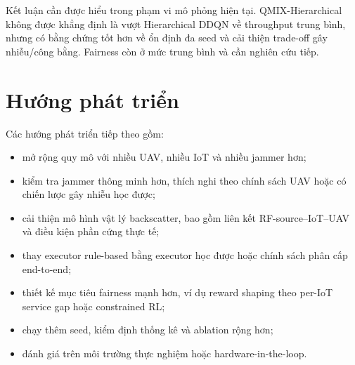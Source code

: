 Kết luận cần được hiểu trong phạm vi mô phỏng hiện tại. QMIX-Hierarchical không được khẳng định là vượt Hierarchical DDQN về throughput trung bình, nhưng có bằng chứng tốt hơn về ổn định đa seed và cải thiện trade-off gây nhiễu/công bằng. Fairness còn ở mức trung bình và cần nghiên cứu tiếp.

\section{Hướng phát triển}

Các hướng phát triển tiếp theo gồm:

\begin{itemize}
  \item mở rộng quy mô với nhiều UAV, nhiều IoT và nhiều jammer hơn;
  \item kiểm tra jammer thông minh hơn, thích nghi theo chính sách UAV hoặc có chiến lược gây nhiễu học được;
  \item cải thiện mô hình vật lý backscatter, bao gồm liên kết RF-source--IoT--UAV và điều kiện phần cứng thực tế;
  \item thay executor rule-based bằng executor học được hoặc chính sách phân cấp end-to-end;
  \item thiết kế mục tiêu fairness mạnh hơn, ví dụ reward shaping theo per-IoT service gap hoặc constrained RL;
  \item chạy thêm seed, kiểm định thống kê và ablation rộng hơn;
  \item đánh giá trên môi trường thực nghiệm hoặc hardware-in-the-loop.
\end{itemize}
